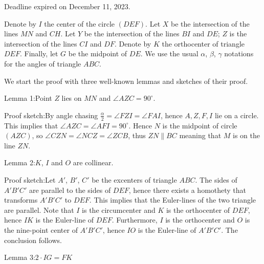 \documentclass{article}
\begin{document}
Deadline expired on December 11, 2023.

Denote by \(\displaystyle I\) the center of the circle \(\displaystyle (DEF)\). Let \(\displaystyle X\) be the intersection of the lines \(\displaystyle MN\) and \(\displaystyle CH\). Let \(\displaystyle Y \) be the intersection of the lines \(\displaystyle BI \) and \(\displaystyle DE\); \(\displaystyle Z\) is the intersection of the lines \(\displaystyle CI\) and \(\displaystyle DF\). Denote by \(\displaystyle K\) the orthocenter of triangle \(\displaystyle DEF\). Finally, let \(\displaystyle G\) be the midpoint of \(\displaystyle DE\). We use the usual \(\displaystyle \alpha\), \(\displaystyle \beta\), \(\displaystyle \gamma\) notations for the angles of triangle \(\displaystyle ABC\).

We start the proof with three well-known lemmas and sketches of their proof.

Lemma 1:Point \(\displaystyle Z\) lies on \(\displaystyle MN\) and \(\displaystyle \angle AZC=90^\circ\).

Proof sketch:By angle chasing \(\displaystyle \frac{\alpha}{2}=\angle FZI=\angle FAI\), hence \(\displaystyle A, Z, F, I\) lie on a circle. This implies that \(\displaystyle \angle AZC=\angle AFI=90^\circ\). Hence \(\displaystyle N\) is the midpoint of circle \(\displaystyle (AZC)\), so \(\displaystyle \angle CZN=\angle NCZ=\angle ZCB\), thus \(\displaystyle ZN \parallel BC\) meaning that \(\displaystyle M\) is on the line \(\displaystyle ZN\).

Lemma 2:\(\displaystyle K\), \(\displaystyle I\) and \(\displaystyle O\) are collinear.

Proof sketch:Let \(\displaystyle A'\), \(\displaystyle B'\), \(\displaystyle C'\) be the excenters of triangle \(\displaystyle ABC\). The sides of \(\displaystyle A'B'C'\) are parallel to the sides of \(\displaystyle DEF\), hence there exists a homothety that transforms \(\displaystyle A'B'C'\) to \(\displaystyle DEF\). This implies that the Euler-lines of the two triangle are parallel. Note that \(\displaystyle I\) is the circumcenter and \(\displaystyle K\) is the orthocenter of \(\displaystyle DEF\), hence \(\displaystyle IK\) is the Euler-line of \(\displaystyle DEF\). Furthermore, \(\displaystyle I\) is the orthocenter and \(\displaystyle O\) is the nine-point center of \(\displaystyle A'B'C'\), hence \(\displaystyle IO\) is the Euler-line of \(\displaystyle A'B'C'\). The conclusion follows.

Lemma 3:\(\displaystyle 2 \cdot IG=FK\)
\end{document}
